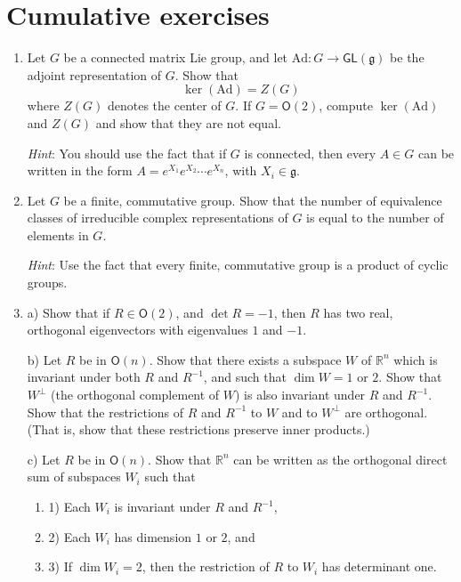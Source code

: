 \documentclass[12pt]{amsbook}
\let \frak = \mathfrak
\theoremstyle{plain}
\numberwithin{equation}{chapter}
\numberwithin{theorem}{chapter}
\begin{document}
\chapter{Cumulative exercises}

\begin{enumerate}
\item  Let $G$ be a connected matrix Lie group, and let $\mathrm{Ad}%
:G\rightarrow\mathsf{GL}(\frak{g})$ be the adjoint representation of $G$. Show
that
\[
\ker(\mathrm{Ad})=Z(G)
\]
where $Z(G)$ denotes the center of $G$. If $G=\mathsf{O}(2)$, compute
$\ker(\mathrm{Ad})$ and $Z(G)$ and show that they are not equal.

\textit{Hint}: You should use the fact that if $G$ is connected, then every
$A\in G$ can be written in the form $A=e^{X_{1}}e^{X_{2}}\cdots e^{X_{n}}$,
with $X_{i}\in\frak{g}$.

\item  Let $G$ be a finite, commutative group. Show that the number of
equivalence classes of irreducible complex representations of $G$ is equal to
the number of elements in $G$.

\textit{Hint}: Use the fact that every finite, commutative group is a product
of cyclic groups.

\item  a) Show that if $R\in\mathsf{O}(2)$, and $\det R=-1$, then $R$ has two
real, orthogonal eigenvectors with eigenvalues $1$ and $-1$.

b) Let $R$ be in $\mathsf{O}(n)$. Show that there exists a subspace $W$ of
$\mathbb{R}^{n}$ which is invariant under both $R$ and $R^{-1}$, and such that
$\dim W=1$ or $2$. Show that $W^{\perp}$ (the orthogonal complement of $W$) is
also invariant under $R$ and $R^{-1}$. Show that the restrictions of $R$ and
$R^{-1}$ to $W$ and to $W^{\perp}$ are orthogonal. (That is, show that these
restrictions preserve inner products.)

c) Let $R$ be in $\mathsf{O}(n)$. Show that $\mathbb{R}^{n}$ can be written as
the orthogonal direct sum of subspaces $W_{i}$ such that

\begin{enumerate}
\item 1) Each $W_{i}$ is invariant under $R$ and $R^{-1}$,

\item 2) Each $W_{i}$ has dimension $1$ or $2$, and

\item 3) If $\dim W_{i}=2$, then the restriction of $R$ to $W_{i}$ has
determinant one.
\end{enumerate}


\end{enumerate}
\end{document}
